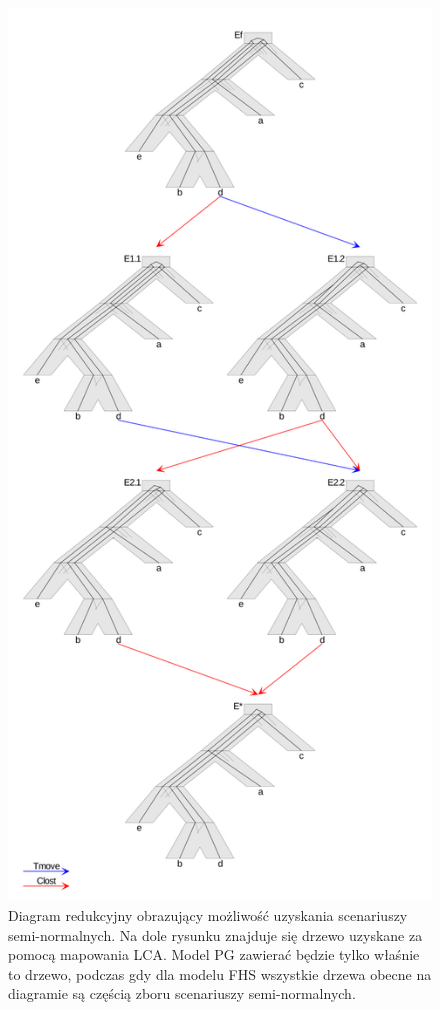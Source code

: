 \documentclass[licencjacka]{pracamgr}
\begin{document}
\begin{figure}[H]
  \includegraphics[width=\textwidth,height=\textheight,keepaspectratio]{./pictures/diagram.png}
  \caption{Diagram redukcyjny obrazujący możliwość uzyskania scenariuszy semi-normalnych. Na dole rysunku znajduje się drzewo uzyskane za pomocą mapowania LCA. Model PG zawierać będzie tylko właśnie to drzewo, podczas gdy dla modelu FHS wszystkie drzewa obecne na diagramie są częścią zboru scenariuszy semi-normalnych.}
\end{figure}
\end{document}
